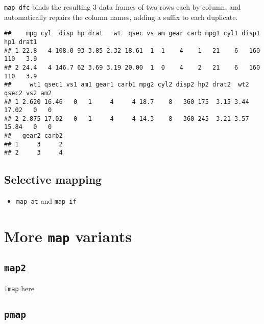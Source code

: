 \documentclass[
]{book}
\newenvironment{Shaded}{}{}
\newcommand{\DataTypeTok}[1]{\textcolor[rgb]{0.56,0.13,0.00}{#1}}
\newcommand{\DecValTok}[1]{\textcolor[rgb]{0.25,0.63,0.44}{#1}}
\newcommand{\KeywordTok}[1]{\textcolor[rgb]{0.00,0.44,0.13}{\textbf{#1}}}
\newcommand{\NormalTok}[1]{#1}
\newcommand{\OperatorTok}[1]{\textcolor[rgb]{0.40,0.40,0.40}{#1}}
\newcommand{\StringTok}[1]{\textcolor[rgb]{0.25,0.44,0.63}{#1}}
\providecommand{\tightlist}{%
  \setlength{\itemsep}{0pt}\setlength{\parskip}{0pt}}
\begin{document}
\texttt{map\_dfc} binds the resulting 3 data frames of two rows each by column, and automatically repairs the column names, adding a suffix to each duplicate.

\begin{Shaded}
\end{Shaded}

\begin{verbatim}
##    mpg cyl  disp hp drat   wt  qsec vs am gear carb mpg1 cyl1 disp1 hp1 drat1
## 1 22.8   4 108.0 93 3.85 2.32 18.61  1  1    4    1   21    6   160 110   3.9
## 2 24.4   4 146.7 62 3.69 3.19 20.00  1  0    4    2   21    6   160 110   3.9
##     wt1 qsec1 vs1 am1 gear1 carb1 mpg2 cyl2 disp2 hp2 drat2  wt2 qsec2 vs2 am2
## 1 2.620 16.46   0   1     4     4 18.7    8   360 175  3.15 3.44 17.02   0   0
## 2 2.875 17.02   0   1     4     4 14.3    8   360 245  3.21 3.57 15.84   0   0
##   gear2 carb2
## 1     3     2
## 2     3     4
\end{verbatim}

\hypertarget{selective-mapping}{%
\subsection{Selective mapping}\label{selective-mapping}}

\begin{itemize}
\tightlist
\item
  \texttt{map\_at} and \texttt{map\_if}
\end{itemize}

\hypertarget{more-map-variants}{%
\section{\texorpdfstring{More \texttt{map} variants}{More map variants}}\label{more-map-variants}}

\hypertarget{map2}{%
\subsection{\texorpdfstring{\texttt{map2}}{map2}}\label{map2}}

\texttt{imap} here

\hypertarget{pmap}{%
\subsection{\texorpdfstring{\texttt{pmap}}{pmap}}\label{pmap}}
\end{document}
